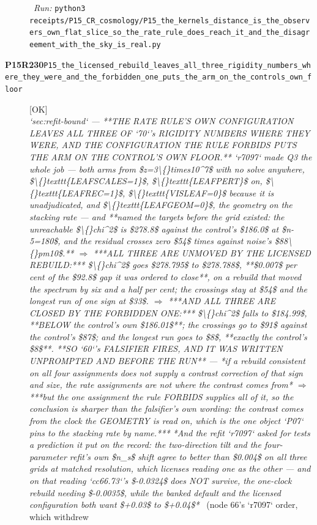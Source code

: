 \begin{description}
\ \emph{Run:} \texttt{python3 receipts/P15\_CR\_cosmology/P15\_the\_kernels\_distance\_is\_the\_observers\_own\_flat\_slice\_so\_the\_rate\_rule\_does\_reach\_it\_and\_the\_disagreement\_with\_the\_sky\_is\_real.py}
\item[\rcptlabel{P15_the_licensed_rebuild_leaves_all_three_rigidity_numbers_where_they_were_and_the_forbidden_one_puts_the_arm_on_the_controls_own_floor}{P15R230}\textbf{P15R230}\quad\texttt{P15\_the\_licensed\_rebuild\_leaves\_all\_three\_rigidity\_numbers\_where\_they\_were\_and\_the\_forbidden\_one\_puts\_the\_arm\_on\_the\_controls\_own\_floor}]\hfill\textsf{[OK]}\\
\textit{`sec:refit-bound` --- **THE RATE RULE'S OWN CONFIGURATION LEAVES ALL THREE OF `70`'s RIGIDITY NUMBERS WHERE THEY WERE, AND THE CONFIGURATION THE RULE FORBIDS PUTS THE ARM ON THE CONTROL'S OWN FLOOR.** `r7097` made Q3 the whole job --- both arms from \$z=3\textbackslash\{\}times10\textasciicircum{}7\$ with no solve anywhere, \$\textbackslash\{\}texttt\{LEAFSCALES=1\}\$, \$\textbackslash\{\}texttt\{LEAFPERT\}\$ on, \$\textbackslash\{\}texttt\{LEAFREC=1\}\$, \$\textbackslash\{\}texttt\{VISLEAF=0\}\$ because it is unadjudicated, and \$\textbackslash\{\}texttt\{LEAFGEOM=0\}\$, the geometry on the stacking rate --- and **named the targets before the grid existed: the unreachable \$\textbackslash\{\}chi\textasciicircum{}2\$ is \$278.8\$ against the control's \$186.0\$ at \$n-5=180\$, and the residual crosses zero \$54\$ times against noise's \$88\textbackslash\{\}pm10\$.** \ensuremath{\Rightarrow} ***ALL THREE ARE UNMOVED BY THE LICENSED REBUILD:*** \$\textbackslash\{\}chi\textasciicircum{}2\$ goes \$278.795\$ to \$278.788\$, **\$0.007\$ per cent of the \$92.8\$ gap it was ordered to close**, on a rebuild that moved the spectrum by six and a half per cent; the crossings stay at \$54\$ and the longest run of one sign at \$33\$. \ensuremath{\Rightarrow} ***AND ALL THREE ARE CLOSED BY THE FORBIDDEN ONE:*** \$\textbackslash\{\}chi\textasciicircum{}2\$ falls to \$184.99\$, **BELOW the control's own \$186.01\$**; the crossings go to \$91\$ against the control's \$87\$; and the longest run goes to \$8\$, **exactly the control's \$8\$**.  **SO `60`'s FALSIFIER FIRES, AND IT WAS WRITTEN UNPROMPTED AND BEFORE THE RUN** --- *if a rebuild consistent on all four assignments does not supply a contrast correction of that sign and size, the rate assignments are not where the contrast comes from* \ensuremath{\Rightarrow} ***but the one assignment the rule FORBIDS supplies all of it, so the conclusion is sharper than the falsifier's own wording: the contrast comes from the clock the GEOMETRY is read on, which is the one object `P07` pins to the stacking rate by name.***  *And the refit `r7097` asked for tests a prediction it put on the record: the two-direction tilt and the four-parameter refit's own \$n\_s\$ shift agree to better than \$0.004\$ on all three grids at matched resolution, which licenses reading one as the other --- and on that reading `cc66.73`'s \$-0.0324\$ does NOT survive, the one-clock rebuild needing \$-0.0035\$, while the banked default and the licensed configuration both want \$+0.03\$ to \$+0.04\$*} \ (node 66's `r7097` order, which withdrew 
\end{description}
